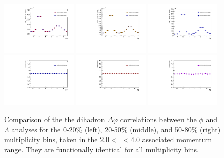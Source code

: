\begin{figure}[ht]
    \includegraphics[width=0.32\textwidth]{figures/analysis/h_h_dphi_0_20_justin_ryan_comparison.pdf}
    \includegraphics[width=0.32\textwidth]{figures/analysis/h_h_dphi_20_50_justin_ryan_comparison.pdf}
    \includegraphics[width=0.32\textwidth]{figures/analysis/h_h_dphi_50_80_justin_ryan_comparison.pdf}
    \includegraphics[width=0.32\textwidth]{figures/analysis/justin_ryan_ratio_0_20}
    \includegraphics[width=0.32\textwidth]{figures/analysis/justin_ryan_ratio_20_50}
    \includegraphics[width=0.32\textwidth]{figures/analysis/justin_ryan_ratio_50_80}
    \caption{Comparison of the the dihadron $\Delta\varphi$ correlations between the $\phi$ and $\Lambda$ analyses for the 0-20\% (left), 20-50\% (middle), and 50-80\% (right) multiplicity bins, taken in the $2.0 <$ \pt $< 4.0$ \GeVc associated momentum range. They are functionally identical for all multiplicity bins.}
    \label{fig:dihadron_comp}
\end{figure}

